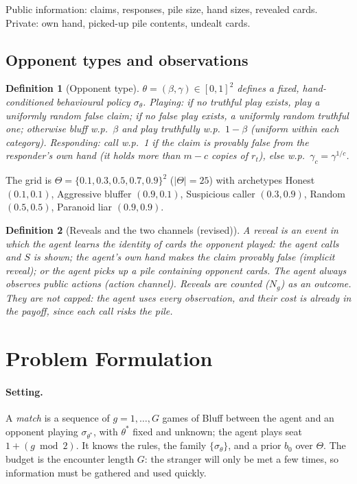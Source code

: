 \documentclass[11pt]{article}
\newtheorem{definition}{Definition}
\newcommand{\new}[1]{\textcolor{blue!55!black}{#1}}
\begin{document}
Public information: claims, responses, pile size, hand sizes, revealed cards. Private: own hand, picked-up pile contents, undealt cards.

\subsection{Opponent types and observations}
\begin{definition}[Opponent type]
$\theta=(\beta,\gamma)\in[0,1]^2$ defines a fixed, hand-conditioned behavioural policy $\sigma_\theta$.
\emph{Playing:} if no truthful play exists, play a uniformly random false claim; if no false play exists, a uniformly random truthful one; otherwise bluff w.p.\ $\beta$ and play truthfully w.p.\ $1-\beta$ (uniform within each category).
\emph{Responding:} call w.p.\ 1 if the claim is provably false from the responder's own hand (it holds more than $m-c$ copies of $r_t$), else w.p.\ $\gamma_c=\gamma^{1/c}$.
\end{definition}
The grid is $\Theta=\{0.1,0.3,0.5,0.7,0.9\}^2$ ($|\Theta|=25$) with archetypes Honest $(0.1,0.1)$, Aggressive bluffer $(0.9,0.1)$, Suspicious caller $(0.3,0.9)$, Random $(0.5,0.5)$, Paranoid liar $(0.9,0.9)$.

\begin{definition}[Reveals and the two channels \new{(revised)}]
A \emph{reveal} is an event in which the agent learns the identity of cards the opponent played: the agent calls and $S$ is shown; the agent's own hand makes the claim provably false (\emph{implicit reveal}); or the agent picks up a pile containing opponent cards. The agent always observes public actions (\emph{action channel}). \new{Reveals are counted ($N_g$) as an outcome. They are not capped: the agent uses every observation, and their cost is already in the payoff, since each call risks the pile.}
\end{definition}

\section{Problem Formulation}
\paragraph{Setting.} A \emph{match} is a sequence of $g=1,\dots,G$ games of Bluff between the agent and an opponent playing $\sigma_{\theta^*}$, with $\theta^*$ fixed and unknown; the agent plays seat $1+(g\bmod 2)$. It knows the rules, the family $\{\sigma_\theta\}$, and a prior $b_0$ over $\Theta$. \new{The budget is the encounter length $G$: the stranger will only be met a few times, so information must be gathered and used quickly.}
\end{document}
